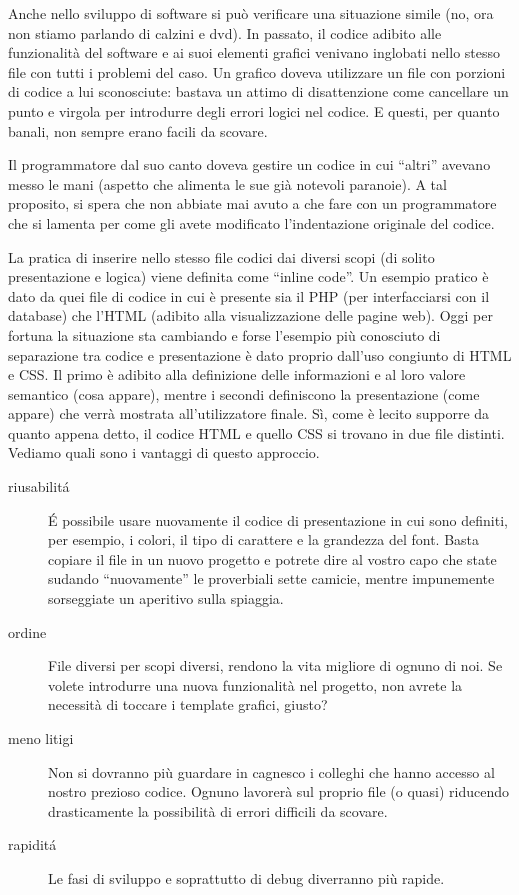 Anche nello sviluppo di software si può verificare una situazione simile (no, ora non stiamo parlando di calzini e dvd). In passato, il codice adibito alle funzionalità del software e ai suoi elementi grafici venivano inglobati nello stesso file con tutti i problemi del caso. Un grafico doveva utilizzare un file con porzioni di codice a lui sconosciute: bastava un attimo di disattenzione come cancellare un punto e virgola per introdurre degli errori logici nel codice. E questi, per quanto banali, non sempre erano facili da scovare.

Il programmatore dal suo canto doveva gestire un codice in cui ``altri'' avevano messo le mani (aspetto che alimenta le sue già notevoli paranoie). A tal proposito, si spera che non abbiate mai avuto a che fare con un programmatore che si lamenta per come gli avete modificato l'indentazione originale del codice.

La pratica di inserire nello stesso file codici dai diversi scopi (di solito presentazione e logica) viene definita come ``inline code''. Un esempio pratico è dato da quei file di codice in cui è presente sia il \ac{PHP} (per interfacciarsi con il database) che l'\ac{HTML} (adibito alla visualizzazione delle pagine web). Oggi per fortuna la situazione sta cambiando e forse l'esempio più conosciuto di separazione tra codice e presentazione è dato proprio dall'uso congiunto di \ac{HTML} e \ac{CSS}. Il primo è adibito alla definizione delle informazioni e al loro valore semantico (cosa appare), mentre i secondi definiscono la presentazione (come appare) che verrà mostrata all'utilizzatore finale. Sì, come è lecito supporre da quanto appena detto, il codice \ac{HTML} e quello \ac{CSS} si trovano in due file distinti. Vediamo quali sono i vantaggi di questo approccio.

\begin{description}
\item [riusabilit\'a] \'E possibile usare nuovamente il codice di presentazione in cui sono definiti, per esempio, i colori, il tipo di carattere e la grandezza del font. Basta copiare il file in un nuovo progetto e potrete dire al vostro capo che state sudando ``nuovamente'' le proverbiali sette camicie, mentre impunemente sorseggiate un aperitivo sulla spiaggia. 
\item [ordine] File diversi per scopi diversi, rendono la vita migliore di ognuno di noi. Se volete introdurre una nuova funzionalità nel progetto, non avrete la necessità di toccare i template grafici, giusto?
\item [meno litigi] Non si dovranno più guardare in cagnesco i colleghi che hanno accesso al nostro prezioso codice. Ognuno lavorerà sul proprio file (o quasi) riducendo drasticamente la possibilità di errori difficili da scovare.
\item [rapidit\'a] Le fasi di sviluppo e soprattutto di debug diverranno più rapide.
\end{description}

